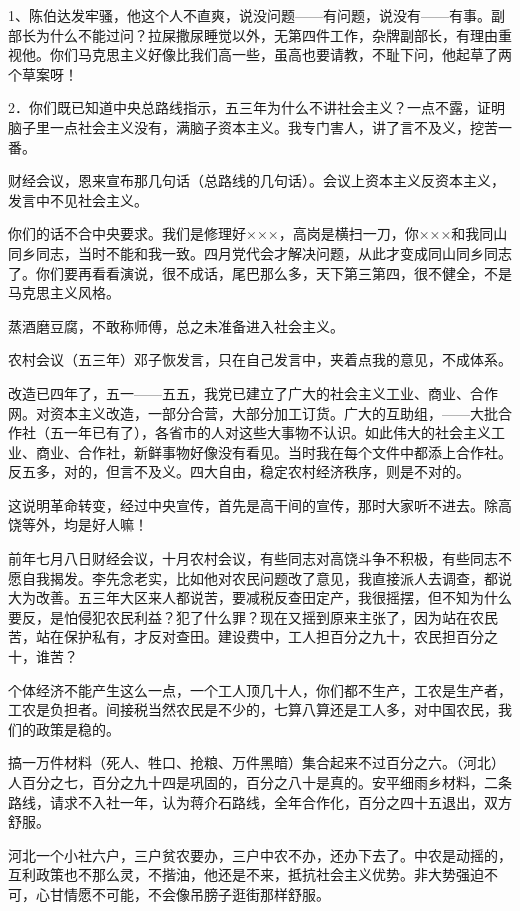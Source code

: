 1、陈伯达发牢骚，他这个人不直爽，说没问题——有问题，说没有——有事。副部长为什么不能过问？拉屎撒尿睡觉以外，无第四件工作，杂牌副部长，有理由重视他。你们马克思主义好像比我们高一些，虽高也要请教，不耻下问，他起草了两个草案呀！

2．你们既已知道中央总路线指示，五三年为什么不讲社会主义？一点不露，证明脑子里一点社会主义没有，满脑子资本主义。我专门害人，讲了言不及义，挖苦一番。

财经会议，恩来宣布那几句话（总路线的几句话）。会议上资本主义反资本主义，发言中不见社会主义。

你们的话不合中央要求。我们是修理好×××，高岗是横扫一刀，你×××和我同山同乡同志，当时不能和我一致。四月党代会才解决问题，从此才变成同山同乡同志了。你们要再看看演说，很不成话，尾巴那么多，天下第三第四，很不健全，不是马克思主义风格。

蒸酒磨豆腐，不敢称师傅，总之未准备进入社会主义。

农村会议（五三年）邓子恢发言，只在自己发言中，夹着点我的意见，不成体系。

改造已四年了，五一——五五，我党已建立了广大的社会主义工业、商业、合作网。对资本主义改造，一部分合营，大部分加工订货。广大的互助组，——大批合作社（五一年已有了），各省市的人对这些大事物不认识。如此伟大的社会主义工业、商业、合作社，新鲜事物好像没有看见。当时我在每个文件中都添上合作社。反五多，对的，但言不及义。四大自由，稳定农村经济秩序，则是不对的。

这说明革命转变，经过中央宣传，首先是高干间的宣传，那时大家听不进去。除高饶等外，均是好人嘛！

前年七月八日财经会议，十月农村会议，有些同志对高饶斗争不积极，有些同志不愿自我揭发。李先念老实，比如他对农民问题改了意见，我直接派人去调查，都说大为改善。五三年大区来人都说苦，要减税反查田定产，我很摇摆，但不知为什么要反，是怕侵犯农民利益？犯了什么罪？现在又摇到原来主张了，因为站在农民苦，站在保护私有，才反对查田。建设费中，工人担百分之九十，农民担百分之十，谁苦？

个体经济不能产生这么一点，一个工人顶几十人，你们都不生产，工农是生产者，工农是负担者。间接税当然农民是不少的，七算八算还是工人多，对中国农民，我们的政策是稳的。

搞一万件材料（死人、牲口、抢粮、万件黑暗）集合起来不过百分之六。（河北）人百分之七，百分之九十四是巩固的，百分之八十是真的。安平细雨乡材料，二条路线，请求不入社一年，认为蒋介石路线，全年合作化，百分之四十五退出，双方舒服。

河北一个小社六户，三户贫农要办，三户中农不办，还办下去了。中农是动摇的，互利政策也不那么灵，不揩油，他还是不来，抵抗社会主义优势。非大势强迫不可，心甘情愿不可能，不会像吊膀子逛街那样舒服。

